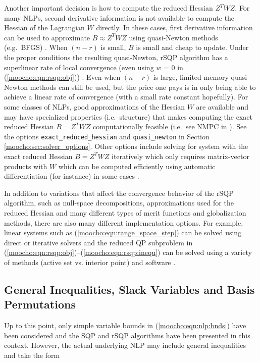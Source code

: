 \documentclass[pdf,ps2pdf,11pt]{SANDreport}
\begin{document}
{Another important decision is how to compute the reduced Hessian $Z^T
W Z$.  For many NLPs, second derivative information is not available
to compute the Hessian of the Lagrangian $W$ directly.  In these
cases, first derivative information can be used to approximate $B
\approx Z^T W Z$ using quasi-Newton methods (e.g.~BFGS)
\cite{ref:nocedal_overton_1985}.  When $(n-r)$ is small, $B$ is small
and cheap to update.  Under the proper conditions the resulting
quasi-Newton, rSQP algorithm has a superlinear rate of local
convergence (even using $w$ = 0 in (\ref{moocho:eqn:rsqp:obj}))
\cite{ref:biegler_et_al_1995}.  Even when $(n-r)$ is large,
limited-memory quasi-Newton methods can still be used, but the price
one pays is in only being able to achieve a linear rate of convergence
(with a small rate constant hopefully).  For some classes of NLPs,
good approximations of the Hessian $W$ are available and may have
specialized properties (i.e.~structure) that makes computing the exact
reduced Hessian $B = Z^T W Z$ computationally feasible (i.e.~see NMPC
in \cite{RABartlett_2001}).  See the options
\texttt{exact\_reduced\_hessian} and \texttt{quasi\_newton} in Section
\ref{moocho:sec:solver_options}.  Other options include solving for
system with the exact reduced Hessian $B = Z^T W Z$ iteratively which
only requires matrix-vector products with $W$ which can be computed
efficiently using automatic differentiation (for instance) in some
cases \cite{ref:adolc_1996}.

In addition to variations that affect the convergence behavior of the
rSQP algorithm, such as null-space decompositions, approximations used
for the reduced Hessian and many different types of merit functions
and globalization methods, there are also many different
implementation options.  For example, linear systems such as
(\ref{moocho:eqn:range_space_step}) can be solved using direct or
iterative solvers and the reduced QP subproblem in
(\ref{moocho:eqn:rsqp:obj})--(\ref{moocho:eqn:rsqp:inequ}) can be
solved using a variety of methods (active set vs. interior point) and
software \cite{ref:schmid_qpkwik_1994}.

%
\subsection{General Inequalities, Slack Variables and Basis Permutations}
\label{moocho:sec:nlp_with_slacks}
%

Up to this point, only simple variable bounds in
(\ref{moocho:eqn:nlp:bnds}) have been considered and the SQP and rSQP
algorithms have been presented in this context.  However, the actual
underlying NLP may include general inequalities and take the form

}
\end{document}
